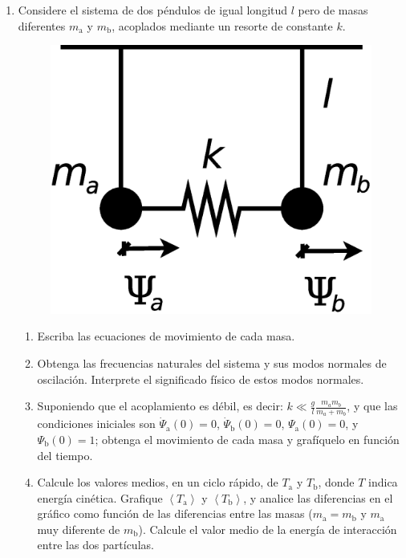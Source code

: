 \documentclass[11pt,spanish]{article}
\begin{document}
\begin{enumerate}

    \item Considere el sistema de dos péndulos de igual longitud $l$ pero de
    masas diferentes $m_\text{a}$ y $m_\text{b}$, acoplados mediante un resorte de
    constante $k$. 

    \begin{figure}[H]
        \centering{}\includegraphics[clip,scale=0.3]{figs/ej1-7}
    \end{figure}

    \begin{enumerate}
        \item Escriba las ecuaciones de movimiento de cada masa.

        \item Obtenga las frecuencias naturales del sistema y sus modos normales
        de oscilación. Interprete el significado físico de estos modos normales.
 
        \item Suponiendo que el acoplamiento es débil, es decir:
        $k\ll\frac{g}{l}\frac{m_{a}m_{b}}{m_{a}+m_{b}}$, y que las condiciones
        iniciales son $\dot{\Psi}_\text{a}(0)=0$, $\dot{\Psi}_\text{b}(0)=0$, 
        $\Psi_\text{a}(0)=0$, y $\Psi_\text{b}(0)=1$; obtenga el movimiento de
        cada masa y grafíquelo en función del tiempo.

        \item Calcule los valores medios, en un ciclo rápido, de $T_\text{a}$ y
        $T_\text{b}$, donde $T$ indica energía cinética. Grafique
        $\left\langle T_\text{a}\right\rangle$ y
        $\left\langle T_\text{b}\right\rangle$, y analice las diferencias en
        el gráfico como función de las diferencias entre las masas
        ($m_\text{a}=m_\text{b}$ y $m_\text{a}$ muy diferente de $m_\text{b}$).
        Calcule el valor medio de la energía de interacción entre las dos
        partículas.


\end{enumerate}
\end{enumerate}
\end{document}
